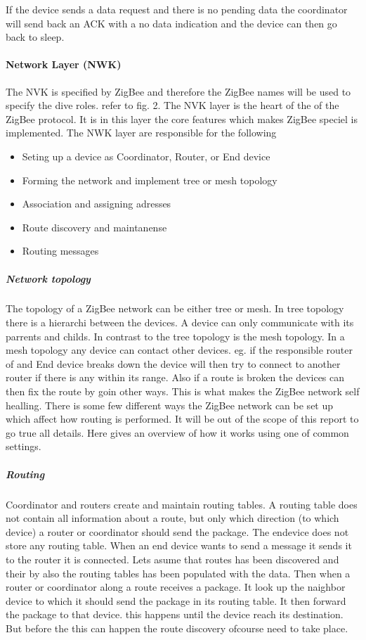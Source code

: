 \documentclass[a4paper,12pt,english]{article}
\begin{document}
If the device sends a data request and there is no pending data the coordinator
will send back an ACK with a no data indication and the device can then go back
to sleep.

\paragraph{Network Layer (NWK)}
The NVK is specified by ZigBee and therefore the ZigBee names will be used
to specify the dive roles. refer to fig. 2. The NVK layer is the heart of the of
the ZigBee protocol. It is in this layer the core features which makes ZigBee
speciel is implemented. The NWK layer are responsible for the following

\begin{itemize}
  \item Seting up a device as Coordinator, Router, or End device
  \item Forming the network and implement tree or mesh topology
  \item Association and assigning adresses
  \item Route discovery and maintanense
  \item Routing messages
 \end{itemize}

\subparagraph{Network topology}  
The topology of a ZigBee network can be either tree or mesh. In tree topology
there is a hierarchi between the devices. A device can only communicate with its
parrents and childs. In contrast to the tree topology is the mesh topology. In a
mesh topology any device can contact other devices. eg. if the responsible
router of and End device breaks down the device will then try to connect to
another router if there is any within its range. Also if a route is broken the
devices can then fix the route by goin other ways. This is what makes the ZigBee
network self healling. There is some few different ways the ZigBee network
can be set up which affect how routing is performed. It will be out of the
scope of this report to go true all details. Here gives an overview of how it
works using one of common settings.

\subparagraph{Routing}
Coordinator and routers create and maintain routing tables. A routing
table does not contain all information about a route, but only which
direction (to which device) a router or coordinator should send the package. The
endevice does not store any routing table. When an end device
wants to send a message it sends it to the router it is connected.
Lets asume that routes has been discovered and their by also the routing tables
has been populated with the data. Then when a router or coordinator along a
route receives a package. It look up the naighbor device to which it should send
the package in its routing table. It then forward the package to that device.
this happens until the device reach its destination. But before the this can
happen the route discovery ofcourse need to take place.
\end{document}
